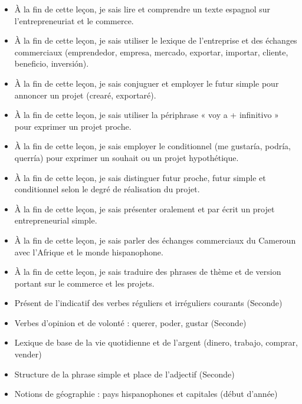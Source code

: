 \documentclass[11pt]{article}
\begin{document}
\begin{objectifs}
\begin{itemize}
\item À la fin de cette leçon, je sais lire et comprendre un texte espagnol sur l'entrepreneuriat et le commerce.
\item À la fin de cette leçon, je sais utiliser le lexique de l'entreprise et des échanges commerciaux (emprendedor, empresa, mercado, exportar, importar, cliente, beneficio, inversión).
\item À la fin de cette leçon, je sais conjuguer et employer le futur simple pour annoncer un projet (crearé, exportaré).
\item À la fin de cette leçon, je sais utiliser la périphrase « voy a + infinitivo » pour exprimer un projet proche.
\item À la fin de cette leçon, je sais employer le conditionnel (me gustaría, podría, querría) pour exprimer un souhait ou un projet hypothétique.
\item À la fin de cette leçon, je sais distinguer futur proche, futur simple et conditionnel selon le degré de réalisation du projet.
\item À la fin de cette leçon, je sais présenter oralement et par écrit un projet entrepreneurial simple.
\item À la fin de cette leçon, je sais parler des échanges commerciaux du Cameroun avec l'Afrique et le monde hispanophone.
\item À la fin de cette leçon, je sais traduire des phrases de thème et de version portant sur le commerce et les projets.
\end{itemize}
\end{objectifs}

\begin{prerequis}
\begin{itemize}
\item Présent de l'indicatif des verbes réguliers et irréguliers courants (Seconde)
\item Verbes d'opinion et de volonté : querer, poder, gustar (Seconde)
\item Lexique de base de la vie quotidienne et de l'argent (dinero, trabajo, comprar, vender)
\item Structure de la phrase simple et place de l'adjectif (Seconde)
\item Notions de géographie : pays hispanophones et capitales (début d'année)
\end{itemize}
\end{prerequis}
\end{document}

